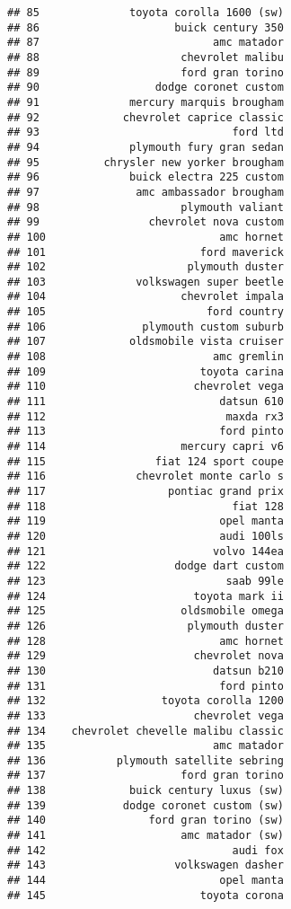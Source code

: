 \documentclass[
]{article}
\begin{document}
\begin{verbatim}
## 85              toyota corolla 1600 (sw)
## 86                     buick century 350
## 87                           amc matador
## 88                      chevrolet malibu
## 89                      ford gran torino
## 90                  dodge coronet custom
## 91              mercury marquis brougham
## 92             chevrolet caprice classic
## 93                              ford ltd
## 94              plymouth fury gran sedan
## 95          chrysler new yorker brougham
## 96              buick electra 225 custom
## 97               amc ambassador brougham
## 98                      plymouth valiant
## 99                 chevrolet nova custom
## 100                           amc hornet
## 101                        ford maverick
## 102                      plymouth duster
## 103              volkswagen super beetle
## 104                     chevrolet impala
## 105                         ford country
## 106               plymouth custom suburb
## 107             oldsmobile vista cruiser
## 108                          amc gremlin
## 109                        toyota carina
## 110                       chevrolet vega
## 111                           datsun 610
## 112                            maxda rx3
## 113                           ford pinto
## 114                     mercury capri v6
## 115                 fiat 124 sport coupe
## 116              chevrolet monte carlo s
## 117                   pontiac grand prix
## 118                             fiat 128
## 119                           opel manta
## 120                           audi 100ls
## 121                          volvo 144ea
## 122                    dodge dart custom
## 123                            saab 99le
## 124                       toyota mark ii
## 125                     oldsmobile omega
## 126                      plymouth duster
## 128                           amc hornet
## 129                       chevrolet nova
## 130                          datsun b210
## 131                           ford pinto
## 132                  toyota corolla 1200
## 133                       chevrolet vega
## 134    chevrolet chevelle malibu classic
## 135                          amc matador
## 136           plymouth satellite sebring
## 137                     ford gran torino
## 138             buick century luxus (sw)
## 139            dodge coronet custom (sw)
## 140                ford gran torino (sw)
## 141                     amc matador (sw)
## 142                             audi fox
## 143                    volkswagen dasher
## 144                           opel manta
## 145                        toyota corona

\end{verbatim}
\end{document}
